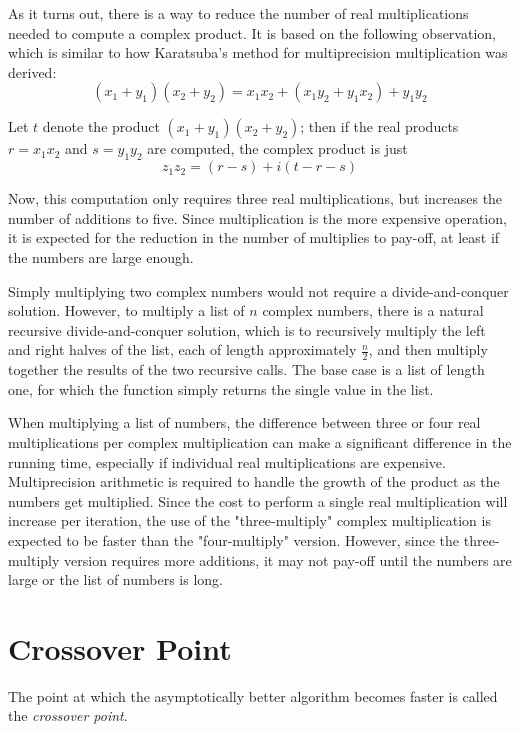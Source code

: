 \documentclass[usletter, 12pt]{article}
\begin{document}
        As it turns out, there is a way to reduce the number of real multiplications needed to compute a complex product. It is based on the following observation, which is similar to how Karatsuba's method for multiprecision multiplication was derived:
            \[ (x_{1}+y_{1})(x_{2}+y_{2})=x_{1}x_{2}+(x_{1}y_{2}+y_{1}x_{2})+y_{1}y_{2} \]

        Let $t$ denote the product $(x_{1}+y_{1})(x_{2}+y_{2})$; then if the real products $r=x_{1}x_{2}$ and $s=y_{1}y_{2}$ are computed, the complex product is just
            \[ z_{1}z_{2}=(r-s)+i(t-r-s) \]

        Now, this computation only requires three real multiplications, but increases the number of additions to five. Since multiplication is the more expensive operation, it is expected for the reduction in the number of multiplies to pay-off, at least if the numbers are large enough.

        Simply multiplying two complex numbers would not require a divide-and-conquer solution. However, to multiply a list of $n$ complex numbers, there is a natural recursive divide-and-conquer solution, which is to recursively multiply the left and right halves of the list, each of length approximately $\frac{n}{2}$, and then multiply together the results of the two recursive calls. The base case is a list of length one, for which the function simply returns the single value in the list.

        When multiplying a list of numbers, the difference between three or four real multiplications per complex multiplication can make a significant difference in the running time, especially if individual real multiplications are expensive. Multiprecision arithmetic is required to handle the growth of the product as the numbers get multiplied. Since the cost to perform a single real multiplication will increase per iteration, the use of the "three-multiply" complex multiplication is expected to be faster than the "four-multiply" version. However, since the three-multiply version requires more additions, it may not pay-off until the numbers are large or the list of numbers is long.

    \section{Crossover Point}

        The point at which the asymptotically better algorithm becomes faster is called the \textit{crossover point}.
\end{document}
